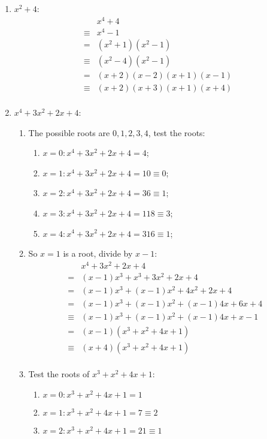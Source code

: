 \documentclass{article}
\begin{document}
\begin{enumerate}
    \item $x^2+4$:
    \begin{align*}
        &x^4+4\\
        \equiv&x^4-1\\
        =&(x^2+1)(x^2-1)\\
        \equiv&(x^2-4)(x^2-1)\\
        =&(x+2)(x-2)(x+1)(x-1)\\
        \equiv&(x+2)(x+3)(x+1)(x+4)\\
    \end{align*}
    \item $x^4+3x^2+2x+4$:
    \begin{enumerate}
        \item The possible roots are $0,1,2,3,4$, test the roots:
        \begin{enumerate}
            \item $x=0:x^4+3x^2+2x+4=4$;
            \item $x=1:x^4+3x^2+2x+4=10\equiv 0$;
            \item $x=2:x^4+3x^2+2x+4=36\equiv 1$;
            \item $x=3:x^4+3x^2+2x+4=118\equiv 3$;
            \item $x=4:x^4+3x^2+2x+4=316\equiv 1$;
        \end{enumerate}
        \item So $x=1$ is a root, divide by $x-1$:
        \begin{align*}
            &x^4+3x^2+2x+4\\
            =&(x-1)x^3+x^3+3x^2+2x+4\\
            =&(x-1)x^3+(x-1)x^2+4x^2+2x+4\\
            =&(x-1)x^3+(x-1)x^2+(x-1)4x+6x+4\\
            \equiv&(x-1)x^3+(x-1)x^2+(x-1)4x+x-1\\
            =&(x-1)(x^3+x^2+4x+1)\\
            \equiv&(x+4)(x^3+x^2+4x+1)\\
        \end{align*}
        \item Test the roots of $x^3+x^2+4x+1$:
        \begin{enumerate}
            \item $x=0:x^3+x^2+4x+1=1$
            \item $x=1:x^3+x^2+4x+1=7\equiv2$
            \item $x=2:x^3+x^2+4x+1=21\equiv 1$

\end{enumerate}
\end{enumerate}
\end{enumerate}
\end{document}
